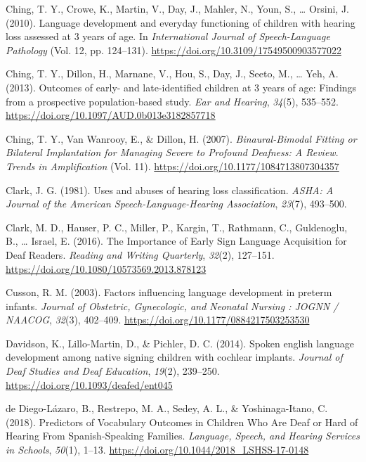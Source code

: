 \documentclass[english,man]{apa6}
\begin{document}
\leavevmode\hypertarget{ref-ching2010}{}%
Ching, T. Y., Crowe, K., Martin, V., Day, J., Mahler, N., Youn, S., \ldots{} Orsini, J. (2010). Language development and everyday functioning of children with hearing loss assessed at 3 years of age. In \emph{International Journal of Speech-Language Pathology} (Vol. 12, pp. 124--131). \url{https://doi.org/10.3109/17549500903577022}

\leavevmode\hypertarget{ref-ching2013}{}%
Ching, T. Y., Dillon, H., Marnane, V., Hou, S., Day, J., Seeto, M., \ldots{} Yeh, A. (2013). Outcomes of early- and late-identified children at 3 years of age: Findings from a prospective population-based study. \emph{Ear and Hearing}, \emph{34}(5), 535--552. \url{https://doi.org/10.1097/AUD.0b013e3182857718}

\leavevmode\hypertarget{ref-ching2007}{}%
Ching, T. Y., Van Wanrooy, E., \& Dillon, H. (2007). \emph{Binaural-Bimodal Fitting or Bilateral Implantation for Managing Severe to Profound Deafness: A Review}. \emph{Trends in Amplification} (Vol. 11). \url{https://doi.org/10.1177/1084713807304357}

\leavevmode\hypertarget{ref-clark1981}{}%
Clark, J. G. (1981). Uses and abuses of hearing loss classification. \emph{ASHA: A Journal of the American Speech-Language-Hearing Association}, \emph{23}(7), 493--500.

\leavevmode\hypertarget{ref-clark2016}{}%
Clark, M. D., Hauser, P. C., Miller, P., Kargin, T., Rathmann, C., Guldenoglu, B., \ldots{} Israel, E. (2016). The Importance of Early Sign Language Acquisition for Deaf Readers. \emph{Reading and Writing Quarterly}, \emph{32}(2), 127--151. \url{https://doi.org/10.1080/10573569.2013.878123}

\leavevmode\hypertarget{ref-cusson2003}{}%
Cusson, R. M. (2003). Factors influencing language development in preterm infants. \emph{Journal of Obstetric, Gynecologic, and Neonatal Nursing : JOGNN / NAACOG}, \emph{32}(3), 402--409. \url{https://doi.org/10.1177/0884217503253530}

\leavevmode\hypertarget{ref-davidson2014}{}%
Davidson, K., Lillo-Martin, D., \& Pichler, D. C. (2014). Spoken english language development among native signing children with cochlear implants. \emph{Journal of Deaf Studies and Deaf Education}, \emph{19}(2), 239--250. \url{https://doi.org/10.1093/deafed/ent045}

\leavevmode\hypertarget{ref-dediego-lazaro2018}{}%
de Diego-Lázaro, B., Restrepo, M. A., Sedey, A. L., \& Yoshinaga-Itano, C. (2018). Predictors of Vocabulary Outcomes in Children Who Are Deaf or Hard of Hearing From Spanish-Speaking Families. \emph{Language, Speech, and Hearing Services in Schools}, \emph{50}(1), 1--13. \url{https://doi.org/10.1044/2018_LSHSS-17-0148}
\end{document}
